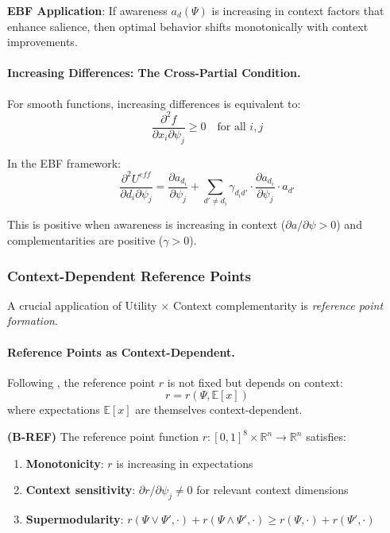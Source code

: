 \textbf{EBF Application}: If awareness $a_d(\Psi)$ is increasing in context 
factors that enhance salience, then optimal behavior shifts monotonically with 
context improvements.

\paragraph{Increasing Differences: The Cross-Partial Condition.}

For smooth functions, increasing differences is equivalent to:
\begin{equation}
\frac{\partial^2 f}{\partial x_i \partial \psi_j} \geq 0 \quad \text{for all } i, j
\end{equation}

In the EBF framework:
\begin{equation}
\frac{\partial^2 U^{eff}}{\partial d_i \partial \psi_j} = 
\frac{\partial a_{d_i}}{\partial \psi_j} + 
\sum_{d' \neq d_i} \gamma_{d_i d'} \cdot \frac{\partial a_{d_i}}{\partial \psi_j} \cdot a_{d'}
\end{equation}

This is positive when awareness is increasing in context ($\partial a / \partial \psi > 0$) 
and complementarities are positive ($\gamma > 0$).

\subsubsection{Context-Dependent Reference Points}

A crucial application of Utility $\times$ Context complementarity is 
\emph{reference point formation}.

\paragraph{Reference Points as Context-Dependent.}

Following \citet{koszegi2006model}, the reference point $r$ is not fixed but 
depends on context:
\begin{equation}
r = r(\Psi, \mathbb{E}[x])
\end{equation}
where expectations $\mathbb{E}[x]$ are themselves context-dependent.

\begin{axiom}
\label{ax:B-REF}
\textbf{(B-REF)} The reference point function $r: [0,1]^8 \times \mathbb{R}^n \to \mathbb{R}^n$ 
satisfies:
\begin{enumerate}
    \item \textbf{Monotonicity}: $r$ is increasing in expectations
    \item \textbf{Context sensitivity}: $\partial r / \partial \psi_j \neq 0$ for 
    relevant context dimensions
    \item \textbf{Supermodularity}: $r(\Psi \vee \Psi', \cdot) + r(\Psi \wedge \Psi', \cdot) 
    \geq r(\Psi, \cdot) + r(\Psi', \cdot)$
\end{enumerate}
\end{axiom}

